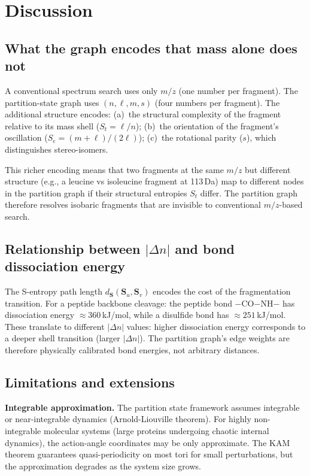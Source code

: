 \documentclass[twocolumn,10pt,a4paper]{article}
\theoremstyle{thmstyle}
\theoremstyle{definition}
\theoremstyle{remark}
\newcommand{\Sv}{\mathbf{S}}
\newcommand{\St}{S_{t}}
\newcommand{\Se}{S_{e}}
\begin{document}
\section{Discussion}
\label{sec:discussion}

\subsection{What the graph encodes that mass alone does not}

A conventional spectrum search uses only $m/z$ (one number per
fragment). The partition-state graph uses $(n, \ell, m, s)$ (four
numbers per fragment). The additional structure encodes:
(a)~the structural complexity of the fragment relative to its mass
shell ($\St = \ell/n$);
(b)~the orientation of the fragment's oscillation ($\Se = (m+\ell)/(2\ell)$);
(c)~the rotational parity ($s$), which distinguishes stereo-isomers.

This richer encoding means that two fragments at the same $m/z$ but
different structure (e.g., a leucine vs isoleucine fragment at
113\,Da) map to different nodes in the partition graph if their
structural entropies $\St$ differ. The partition graph therefore
resolves isobaric fragments that are invisible to conventional
$m/z$-based search.

\subsection{Relationship between $|\Delta n|$ and bond dissociation energy}

The S-entropy path length $d_{\Sv}(\Sv_u, \Sv_v)$ encodes the cost
of the fragmentation transition. For a peptide backbone cleavage:
the peptide bond $-$CO$-$NH$-$ has dissociation energy
$\approx 360$\,kJ/mol, while a disulfide bond has
$\approx 251$\,kJ/mol. These translate to different $|\Delta n|$
values: higher dissociation energy corresponds to a deeper shell
transition (larger $|\Delta n|$). The partition graph's edge weights
are therefore physically calibrated bond energies, not arbitrary
distances.

\subsection{Limitations and extensions}

\textbf{Integrable approximation.} The partition state framework assumes
integrable or near-integrable dynamics (Arnold-Liouville theorem). For
highly non-integrable molecular systems (large proteins undergoing
chaotic internal dynamics), the action-angle coordinates may be only
approximate. The KAM theorem \citep{kolmogorov1954} guarantees
quasi-periodicity on most tori for small perturbations, but the
approximation degrades as the system size grows.
\end{document}
